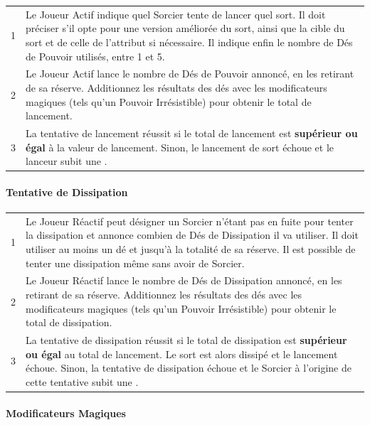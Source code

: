 {\begin{multicols}{2}
\begin{tabular}{c|m{7.4cm}}
1 & Le Joueur Actif indique quel Sorcier tente de lancer quel sort. Il doit préciser s'il opte pour une version améliorée du sort, ainsi que la cible du sort et de celle de l'attribut si nécessaire. Il indique enfin le nombre de Dés de Pouvoir utilisés, entre 1 et 5. \tabularnewline
2 & Le Joueur Actif lance le nombre de Dés de Pouvoir annoncé, en les retirant de sa réserve. Additionnez les résultats des dés avec les modificateurs magiques (tels qu'un Pouvoir Irrésistible) pour obtenir le total de lancement. \tabularnewline
3 & La tentative de lancement réussit si le total de lancement est \textbf{supérieur ou égal} à la valeur de lancement. Sinon, le lancement de sort échoue et le lanceur subit une \lostfocus{}. \tabularnewline
\end{tabular}

\vspace*{10pt}
\paragraph{Tentative de Dissipation}

\begin{tabular}{c|m{7.4cm}}
1 & Le Joueur Réactif peut désigner un Sorcier n'étant pas en fuite pour tenter la dissipation et annonce combien de Dés de Dissipation il va utiliser. Il doit utiliser au moins un dé et jusqu'à la totalité de sa réserve. Il est possible de tenter une dissipation même sans avoir de Sorcier. \tabularnewline
2 & Le Joueur Réactif lance le nombre de Dés de Dissipation annoncé, en les retirant de sa réserve. Additionnez les résultats des dés avec les modificateurs magiques (tels qu'un Pouvoir Irrésistible) pour obtenir le total de dissipation. \tabularnewline
3 & La tentative de dissipation réussit si le total de dissipation est \textbf{supérieur ou égal} au total de lancement. Le sort est alors dissipé et le lancement échoue. Sinon, la tentative de dissipation échoue et le Sorcier à l'origine de cette tentative subit une \lostfocus{}. \tabularnewline
\end{tabular}

\vspace*{20pt}
\begin{framed}
\vspace*{-17pt}
\paragraph{Modificateurs Magiques}


\end{framed}
\end{multicols}}
